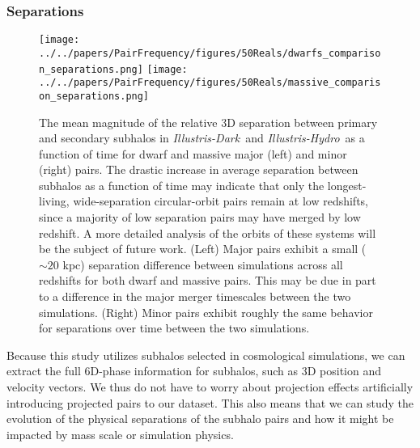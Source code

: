 \documentclass[twocolumn]{aastex63}
\newcommand\ID{\textit{Illustris-Dark}}
\newcommand\IH{\textit{Illustris-Hydro}}
\newcommand{\gb}[1]{\textcolor{olive}{\textbf{#1}} }
\begin{document}
 \subsubsection{Separations}
 \begin{figure*}
  \centering
  \texttt{[image: ../../papers/PairFrequency/figures/50Reals/dwarfs\_comparison\_separations.png]}
  \texttt{[image: ../../papers/PairFrequency/figures/50Reals/massive\_comparison\_separations.png]}
  \caption{\label{fig:separations} The mean magnitude of the relative 3D separation between primary and secondary subhalos in \ID\ and \IH\ as a function of time for dwarf and massive major (left) and minor (right) pairs. The drastic increase in average separation between subhalos as a function of time may indicate that only the longest-living, wide-separation circular-orbit pairs remain at low redshifts, since a majority of low separation pairs may have merged by low redshift. A more detailed analysis of the orbits of these systems will be the subject of future work.
  (Left) Major pairs exhibit a small ($\sim 20$ kpc) separation difference between simulations across all redshifts for both dwarf and massive pairs. 
  This may be due in part to a difference in the major merger timescales between the two simulations. 
  (Right) Minor pairs exhibit roughly the same behavior for separations over time between the two simulations.
  }
\end{figure*}

Because this study utilizes subhalos selected in
cosmological simulations, we can extract the
full 6D-phase information for subhalos, such as 3D position and velocity vectors. 
We thus do not have to worry about projection effects artificially introducing projected pairs to our dataset. This also means that we can study the evolution of the physical separations of the subhalo pairs and how it might be impacted by mass scale or simulation physics. %
\end{document}
